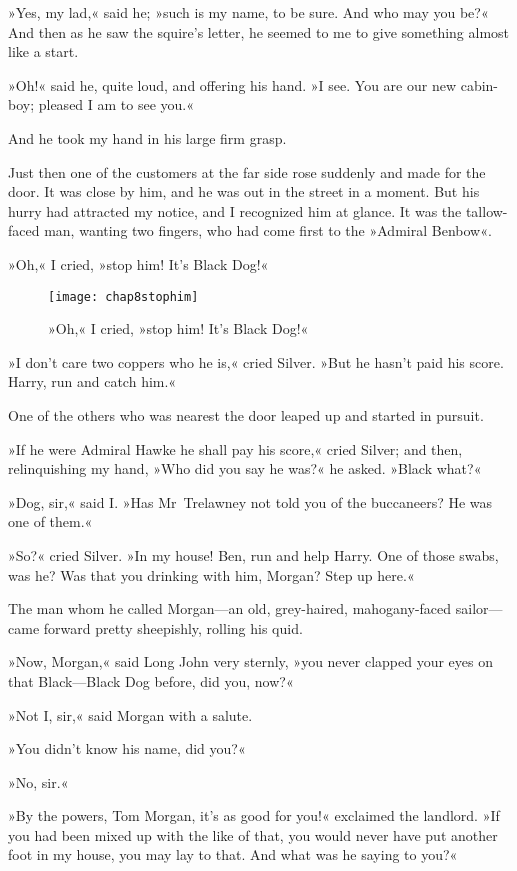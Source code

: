 »Yes, my lad,« said he; »such is my name, to be sure. And who may you be?« And then as he saw the squire's letter, he seemed to me to give something almost like a start.

»Oh!« said he, quite loud, and offering his hand. »I see. You are our new cabin-boy; pleased I am to see you.«

And he took my hand in his large firm grasp.

Just then one of the customers at the far side rose suddenly and made for the door. It was close by him, and he was out in the street in a moment. But his hurry had attracted my notice, and I recognized him at glance. It was the tallow-faced man, wanting two fingers, who had come first to the »Admiral Benbow«.

»Oh,« I cried, »stop him! It's Black Dog!«

\begin{sidewaysfigure}
\texttt{[image: chap8stophim]}%
\caption{»Oh,« I cried, »stop him! It's Black Dog!«}
\end{sidewaysfigure}

»I don't care two coppers who he is,« cried Silver. »But he hasn't paid his score. Harry, run and catch him.«

One of the others who was nearest the door leaped up and started in pursuit.

»If he were Admiral Hawke he shall pay his score,« cried Silver; and then, relinquishing my hand, »Who did you say he was?« he asked. »Black what?«

»Dog, sir,« said I. »Has Mr~Trelawney not told you of the buccaneers? He was one of them.«

»So?« cried Silver. »In my house! Ben, run and help Harry. One of those swabs, was he? Was that you drinking with him, Morgan? Step up here.«

The man whom he called Morgan—an old, grey-haired, mahogany-faced sailor—came forward pretty sheepishly, rolling his quid.

»Now, Morgan,« said Long John very sternly, »you never clapped your eyes on that Black—Black Dog before, did you, now?«

»Not I, sir,« said Morgan with a salute.

»You didn't know his name, did you?«

»No, sir.«

»By the powers, Tom Morgan, it's as good for you!« exclaimed the landlord. »If you had been mixed up with the like of that, you would never have put another foot in my house, you may lay to that. And what was he saying to you?«

